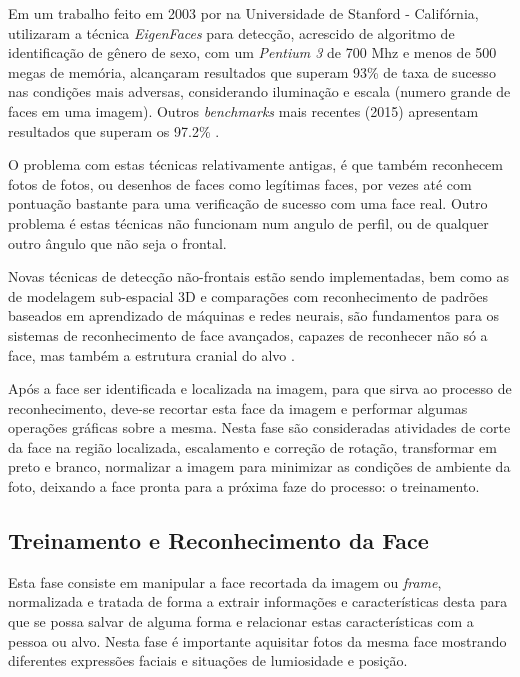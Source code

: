 Em um trabalho feito em 2003 por \cite{final_project_stanford} na Universidade de Stanford - Califórnia, utilizaram a técnica \textit{EigenFaces} para detecção, acrescido de algoritmo de identificação de gênero de sexo, com um \textit{Pentium 3} de 700 Mhz e menos de 500 megas de memória, alcançaram resultados que superam 93\% de taxa de sucesso nas condições mais adversas, considerando iluminação e escala (numero grande de faces em uma imagem). Outros \textit{benchmarks} mais recentes (2015) apresentam resultados que superam os 97.2\% \cite{stats_hong_kong}.

O problema com estas técnicas relativamente antigas, é que também reconhecem fotos de fotos, ou desenhos de faces como legítimas faces, por vezes até com pontuação bastante para uma verificação de sucesso com uma face real. Outro problema é estas técnicas não funcionam num angulo de perfil, ou de qualquer outro ângulo que não seja o frontal.

Novas técnicas de detecção não-frontais estão sendo implementadas, bem como as de modelagem sub-espacial 3D e comparações com reconhecimento de padrões baseados em aprendizado de máquinas e redes neurais, são fundamentos para os sistemas de reconhecimento de face avançados, capazes de reconhecer não só a face, mas também a estrutura cranial do alvo \cite{3dmodel_fd}. 

Após a face ser identificada e localizada na imagem, para que sirva ao processo de reconhecimento, deve-se recortar esta face da imagem e performar algumas operações gráficas sobre a mesma. Nesta fase são consideradas atividades de corte da face na região localizada, escalamento e correção de rotação, transformar em preto e branco, normalizar a imagem para minimizar as condições de ambiente da foto, deixando a face pronta para a próxima faze do processo: o treinamento.


\subsection{Treinamento e Reconhecimento da Face} \label{subsec:treinrecface}

Esta fase consiste em manipular a face recortada da imagem ou \textit{frame}, normalizada e tratada de forma a extrair informações e características desta para que se possa salvar de alguma forma e relacionar estas características com a pessoa ou alvo. Nesta fase é importante aquisitar fotos da mesma face mostrando diferentes expressões faciais e situações de lumiosidade e posição.

